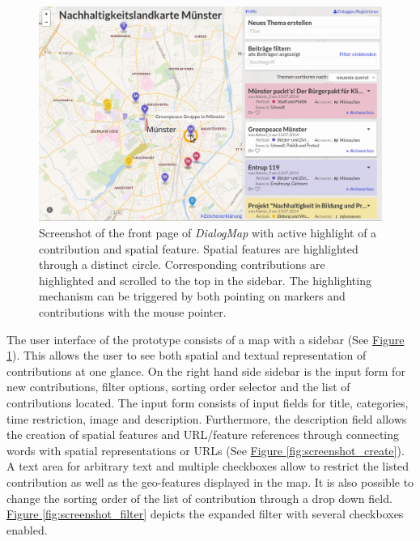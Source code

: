 \begin{figure}[!h]
    \centering
    \includegraphics[width=1\columnwidth]{images/screenshot}
    \caption{Screenshot of the front page of \textit{DialogMap} with active highlight of a contribution and spatial feature. Spatial features are highlighted through a distinct circle. Corresponding contributions are highlighted and scrolled to the top in the sidebar. The highlighting mechanism can be triggered by both pointing on markers and contributions with the mouse pointer.}
    \label{fig:screenshot}
\end{figure}

The user interface of the prototype consists of a map with a sidebar (See \hyperref[fig:screenshot]{Figure \ref{fig:screenshot}}). This allows the user to see both spatial and textual representation of contributions at one glance. On the right hand side sidebar is the input form for new contributions, filter options, sorting order selector and the list of contributions located. The input form consists of input fields for title, categories, time restriction, image and description. Furthermore, the description field allows the creation of spatial features and URL/feature references through connecting words with spatial representations or URLs (See \hyperref[fig:screenshot_create]{Figure \ref{fig:screenshot_create}}).\\
A text area for arbitrary text and multiple checkboxes allow to restrict the listed contribution as well as the geo-features displayed in the map. It is also possible to change the sorting order of the list of contribution through a drop down field. \hyperref[fig:screenshot_filter]{Figure \ref{fig:screenshot_filter}} depicts the expanded filter with several checkboxes enabled.

